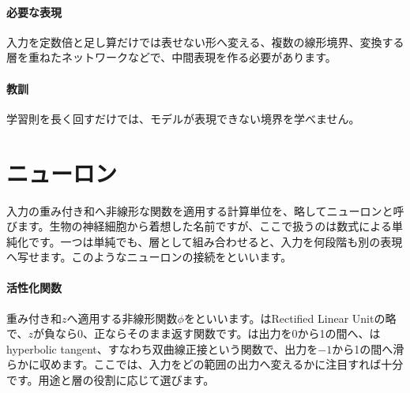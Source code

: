 \paragraph{必要な表現}
        入力を定数倍と足し算だけでは表せない形へ変える、複数の線形境界、変換する層を重ねたネットワークなどで、中間表現を作る必要があります。

\paragraph{教訓}
        学習則を長く回すだけでは、モデルが表現できない境界を学べません。

\par
\endgroup
\par
\endgroup


\section{ニューロン}
\label{sec:06-machine-learning-17}

入力の重み付き和へ非線形な関数を適用する計算単位を、略してニューロンと呼びます。生物の神経細胞から着想した名前ですが、ここで扱うのは数式による単純化です。一つは単純でも、層として組み合わせると、入力を何段階も別の表現へ写せます。このようなニューロンの接続をといいます。

\begingroup
\begingroup
      \centering
      \vspace{5mm}
\paragraph{活性化関数}
        重み付き和$z$へ適用する非線形関数$\phi$をといいます。はRectified Linear Unitの略で、$z$が負なら0、正ならそのまま返す関数です。は出力を0から1の間へ、はhyperbolic tangent、すなわち双曲線正接という関数で、出力を$-1$から1の間へ滑らかに収めます。ここでは、入力をどの範囲の出力へ変えるかに注目すれば十分です。用途と層の役割に応じて選びます。

\par
\endgroup
\medskip
\begingroup
